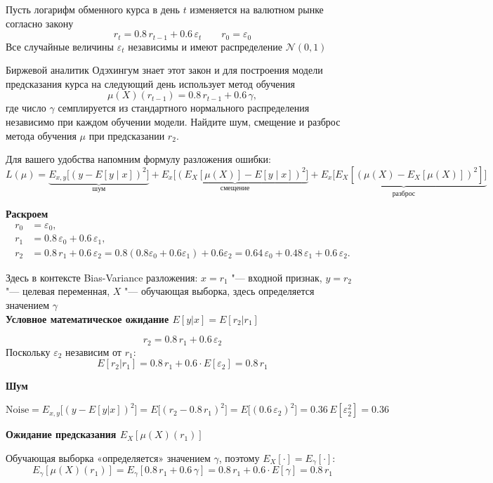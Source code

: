 \documentclass[12pt,a4paper]{article}
\begin{document}
Пусть логарифм обменного курса в день $t$ изменяется на валютном рынке
согласно закону
\[
r_t = 0.8\,r_{t-1} + 0.6\,\varepsilon_t \qquad r_0 = \varepsilon_0
\]
Все случайные величины $\varepsilon_t$ независимы и имеют распределение
$\mathcal{N}(0,1)$

Биржевой аналитик Одэхингум знает этот закон и для построения модели
предсказания курса на следующий день использует метод обучения
\[
\mu(X)(r_{t-1}) = 0.8\,r_{t-1} + 0.6\,\gamma,
\]
где число $\gamma$ семплируется из стандартного нормального распределения
независимо при каждом обучении модели. Найдите шум, смещение и разброс
метода обучения $\mu$ при предсказании $r_2$.

Для вашего удобства напомним формулу разложения ошибки:
\[
L(\mu) = \underbrace{E_{x,y}\bigl[(y - E[y\mid x])^2\bigr]}_{\text{шум}}
+ \underbrace{E_x\bigl[(E_X[\mu(X)] - E[y\mid x])^2\bigr]}_{\text{смещение}}
+ \underbrace{E_x\bigl[E_X[(\mu(X) - E_X[\mu(X)])^2]\bigr]}_{\text{разброс}}
\]

\textbf{Раскроем}
\begin{align}
r_0 &= \varepsilon_0, \\
r_1 &= 0.8\,\varepsilon_0 + 0.6\,\varepsilon_1, \\
r_2 &= 0.8\,r_1 + 0.6\,\varepsilon_2
= 0.8(0.8\varepsilon_0 + 0.6\varepsilon_1) + 0.6\varepsilon_2
= 0.64\,\varepsilon_0 + 0.48\,\varepsilon_1 + 0.6\,\varepsilon_2.
\end{align}

Здесь в контексте Bias-Variance разложения: $x = r_1$ "--- входной признак, $y = r_2$ "--- целевая переменная, $X$ "--- обучающая выборка, здесь определяется значением $\gamma$\\[1mm]

\textbf{Условное математическое ожидание $E[y|x] = E[r_2|r_1]$}

\[
r_2 = 0.8\,r_1 + 0.6\,\varepsilon_2
\]
Поскольку $\varepsilon_2$ независим от $r_1$:
\[
E[r_2 | r_1] = 0.8\,r_1 + 0.6\cdot E[\varepsilon_2]
= 0.8\,r_1
\]

\textbf{Шум}

\[
\text{Noise} = E_{x,y}\bigl[(y - E[y|x])^2\bigr]
= E\bigl[(r_2 - 0.8\,r_1)^2\bigr]
= E\bigl[(0.6\,\varepsilon_2)^2\bigr]
= 0.36\,E[\varepsilon_2^2] = 0.36
\]

\textbf{Ожидание предсказания $E_X[\mu(X)(r_1)]$}

Обучающая выборка «определяется» значением $\gamma$, поэтому
$E_X[\cdot] = E_\gamma[\cdot]$:
\[
E_\gamma[\mu(X)(r_1)] = E_\gamma[0.8\,r_1 + 0.6\,\gamma]
= 0.8\,r_1 + 0.6\cdot E[\gamma] = 0.8\,r_1
\]
\end{document}
